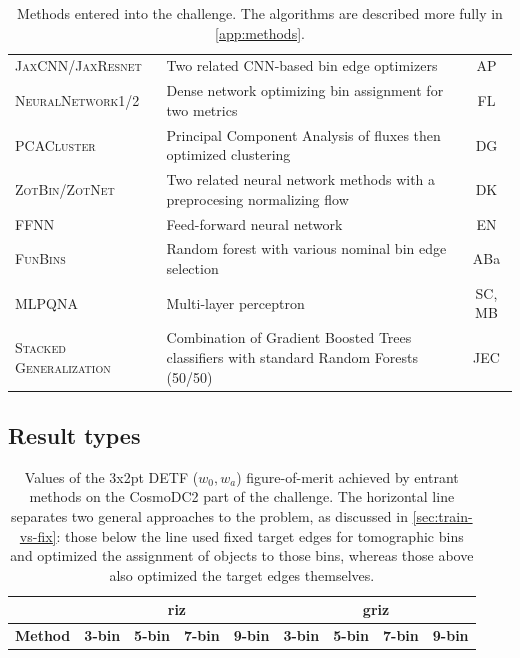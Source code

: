 \documentclass[twocolumn,twocolappendix]{aastex63}
\begin{document}
\begin{table}[]
\begin{tabular}{|l|p{8cm}|c|}
	\textsc{JaxCNN/JaxResnet} & Two related CNN-based bin edge optimizers & AP \\
	\textsc{NeuralNetwork1/2} & Dense network optimizing bin assignment for two metrics & FL \\
	\textsc{PCACluster} & Principal Component Analysis of fluxes then optimized clustering & DG \\
	\textsc{ZotBin/ZotNet} & Two related neural network methods with a preprocesing normalizing flow & DK \\
	\textsc{FFNN} & Feed-forward neural network & EN \\
	\textsc{FunBins} & Random forest with various nominal bin edge selection & ABa \\
	\textsc{MLPQNA} & Multi-layer perceptron & SC, MB \\
	\textsc{Stacked Generalization} & Combination of Gradient Boosted Trees classifiers with standard Random Forests (50/50) & JEC\\
	\hline
	\end{tabular}
	\caption{Methods entered into the challenge. The algorithms are described more fully in \autoref{app:methods}.}
	\label{tab:entrants}
\end{table}



\subsection{Result types}

\begin{table}[]
	\begin{tabular}{|l|llll|llll|}
		\hline
		& \multicolumn{4}{c|}{\textbf{riz}}      & \multicolumn{4}{c|}{\textbf{griz}}                                \\ \hline
		\textbf{Method} & \textbf{3-bin} & \textbf{5-bin} & \textbf{7-bin} & \textbf{9-bin} & \textbf{3-bin} & \textbf{5-bin} & \textbf{7-bin} & \textbf{9-bin} \\ \hline
		
		\hline
	\end{tabular}
	\caption{Values of the 3x2pt DETF ($w_0,w_a$) figure-of-merit achieved by entrant methods on the 
		CosmoDC2 part of the challenge. The horizontal line separates two general approaches to the problem, as discussed in \autoref{sec:train-vs-fix}: those below the line used fixed
		target edges for tomographic bins and optimized the assignment of objects to those bins,
		whereas those above also optimized the target edges themselves.}
	\label{tab:cosmodc2}
\end{table}
\end{document}
